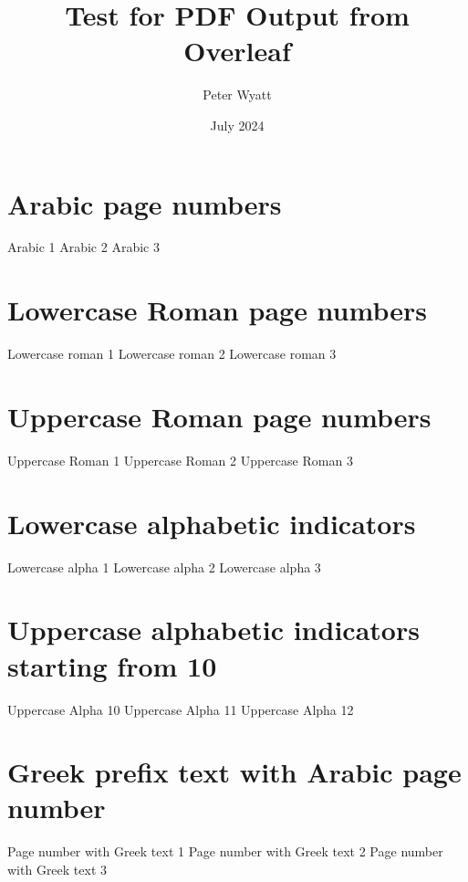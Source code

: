 \documentclass{article}
\begin{document}
\title{Test for PDF Output from Overleaf}
\author{Peter Wyatt}
\date{July 2024}
\maketitle

\tableofcontents

\section{Arabic page numbers}
Arabic 1 \newpage 
Arabic 2 \newpage 
Arabic 3 \newpage

\section{Lowercase Roman page numbers}
Lowercase roman 1 \newpage 
Lowercase roman 2 \newpage 
Lowercase roman 3 \newpage

\section{Uppercase Roman page numbers}
Uppercase Roman 1 \newpage 
Uppercase Roman 2 \newpage 
Uppercase Roman 3 \newpage

\section{Lowercase alphabetic indicators}
Lowercase alpha 1 \newpage 
Lowercase alpha 2 \newpage 
Lowercase alpha 3 \newpage

\section{Uppercase alphabetic indicators starting from 10}
\setcounter{page}{10}
Uppercase Alpha 10 \newpage 
Uppercase Alpha 11 \newpage 
Uppercase Alpha 12 \newpage

 \renewcommand \thepage{λέγ-\arabic{page}}
\section{Greek prefix text with Arabic page number}
Page number with Greek text 1 \newpage 
Page number with Greek text 2 \newpage 
Page number with Greek text 3 \newpage
\end{document}
